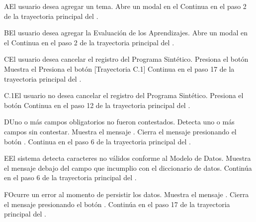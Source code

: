 \begin{UCtrayectoriaA}{A}{El usuario desea agregar un tema.}
\UCpaso Abre un modal en el 
\UCpaso Continua en el paso 2 de la trayectoria principal del .
\end{UCtrayectoriaA}

\begin{UCtrayectoriaA}{B}{El usuario desea agregar la Evaluación de los Aprendizajes.}
\UCpaso Abre un modal en el 
\UCpaso Continua en el paso 2 de la trayectoria principal del .
\end{UCtrayectoriaA}

\begin{UCtrayectoriaA}{C}{El usuario desea cancelar el registro del Programa Sintético.}
\UCpaso[\UCactor] Presiona el botón 
\UCpaso Muestra el 
\UCpaso[\UCactor] Presiona el botón  [Trayectoria C.1]
\UCpaso Continua en el paso 17 de la trayectoria principal del .
\end{UCtrayectoriaA}

\begin{UCtrayectoriaA}{C.1}{El usuario no desea cancelar el registro del Programa Sintético.}
\UCpaso[\UCactor] Presiona el botón 
\UCpaso Continua en el paso 12 de la trayectoria principal del .
\end{UCtrayectoriaA}

\begin{UCtrayectoriaA}{D}{Uno o más campos obligatorios no fueron contestados.}
\UCpaso Detecta uno o más campos sin contestar.
\UCpaso Muestra el mensaje .
\UCpaso[\UCactor] Cierra el mensaje presionando el botón .
\UCpaso Continua en el paso 6 de la trayectoria principal del .
\end{UCtrayectoriaA}

\begin{UCtrayectoriaA}{E}{El sistema detecta caracteres no válidos conforme al Modelo de Datos.}
\UCpaso Muestra el mensaje  debajo del campo que incumplio con el diccionario de datos.
\UCpaso Continúa en el paso 6 de la trayectoria principal del .
\end{UCtrayectoriaA}

\begin{UCtrayectoriaA}{F}{Ocurre un error al momento de persistir los datos.}
\UCpaso Muestra el mensaje .
\UCpaso[\UCactor] Cierra el mensaje presionando el botón .
\UCpaso Continúa en el paso 17 de la trayectoria principal del .
\end{UCtrayectoriaA}